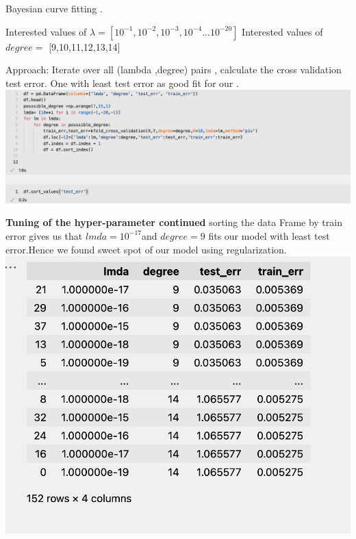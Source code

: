 \documentclass[11pt]{beamer}
\begin{document}
\begin{frame}
Bayesian curve fitting .


Interested values of $\lambda = [10^{-1},10^{-2},10^{-3},10^{-4}...10^{-20}]$
Interested values of $degree=$ [9,10,11,12,13,14]

Approach: Iterate over all (lambda ,degree) pairs , calculate the cross validation test error. One with least test error as good fit for our .
\includegraphics[scale=0.35]{images/11.png}

\end{frame}





\begin{frame}
\textbf{Tuning of the hyper-parameter continued}
sorting the data Frame by train error gives us that $lmda=10^{-17}$and $degree=9$ fits our model with least test error.Hence we found sweet spot of our model using regularization.
\\
\includegraphics[scale=0.27]{images/12.png}


\end{frame}
\end{document}
